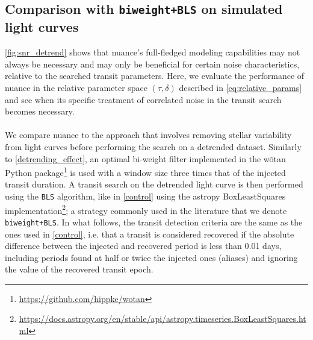 \documentclass[modern]{aastex631}
\newcommand{\footlink}[1]{\footnote{\url{#1}}}
\begin{document}
\subsection{Comparison with \texttt{biweight+BLS} on simulated light curves}\label{simu}
\autoref{fig:snr_detrend} shows that \textsf{nuance}'s full-fledged modeling capabilities may not always be necessary and may only be beneficial for certain noise characteristics, relative to the searched transit parameters. Here, we evaluate the performance of \textsf{nuance} in the relative parameter space $(\tau, \delta)$ described in \autoref{eq:relative_params} and see when its specific treatment of correlated noise in the transit search becomes necessary.\\\\
We compare \textsf{nuance} to the approach that involves removing stellar variability from light curves before performing the search on a detrended dataset. Similarly to \autoref{detrending_effect}, an optimal bi-weight filter implemented in the \textsf{wõtan} Python package\footlink{https://github.com/hippke/wotan} is used with a window size three times that of the injected transit duration. A transit search on the detrended light curve is then performed using the \texttt{BLS} algorithm, like in \autoref{control} using the \textsf{astropy} \textsf{BoxLeastSquares} implementation\footlink{https://docs.astropy.org/en/stable/api/astropy.timeseries.BoxLeastSquares.html}; a strategy commonly used in the literature that we denote \texttt{biweight+BLS}. In what follows, the transit detection criteria are the same as the ones used in \autoref{control}, i.e. that a transit is considered recovered if the absolute difference between the injected and recovered period is less than 0.01 days, including periods found at half or twice the injected ones (aliases) and ignoring the value of the recovered transit epoch.
\end{document}
